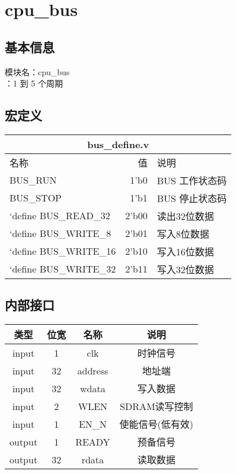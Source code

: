 \section{cpu\_bus}
\subsection{基本信息}
模块名：cpu\_bus\\
：1 到 5 个周期
\subsection{宏定义}
\begin{tabular}{|l|r|l|}
    \hline
    \multicolumn{3}{|c|}{bus\_define.v}\\\hline
    名称    &   值  &   说明\\\hline
    BUS\_RUN     &      1'b0   &  BUS 工作状态码\\ \hline
    BUS\_STOP    &      1'b1   &  BUS 停止状态码\\ \hline
    `define BUS\_READ\_32  & 2'b00 & 读出32位数据 \\ \hline
    `define BUS\_WRITE\_8  & 2'b01 & 写入8位数据 \\ \hline
    `define BUS\_WRITE\_16 & 2'b10 & 写入16位数据 \\ \hline
    `define BUS\_WRITE\_32 & 2'b11 & 写入32位数据 \\ \hline
\end{tabular}
\subsection{内部接口}
\begin{tabular}{|c|c|c|c|}
    \hline
    类型        &   位宽    &   名称    &   说明\\\hline
    input       &   1      &    clk     &   时钟信号\\\hline
    input       &   32     &    address &   地址端\\\hline
    input       &   32      &   wdata   &   写入数据\\\hline
    input       &   2       &   WLEN    &   SDRAM读写控制\\\hline
    input       &   1       &   EN\_N   &   使能信号(低有效)\\\hline
    output      &   1       &   READY   &   预备信号\\\hline
    output      &   32      &   rdata   &   读取数据\\\hline
\end{tabular}
